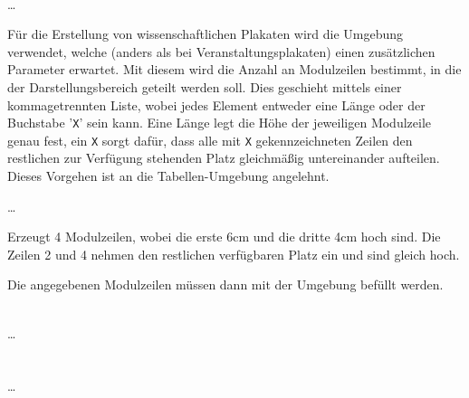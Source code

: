 \begin{Declaration}
    \\
  \quad\dots\\
\end{Declaration}

Für die Erstellung von wissenschaftlichen Plakaten wird die Umgebung
 verwendet, welche
(anders als bei Veranstaltungsplakaten) einen
zusätzlichen Parameter  erwartet.
Mit diesem wird die Anzahl an Modulzeilen bestimmt, in die der Darstellungsbereich geteilt werden soll. Dies geschieht mittels einer kommagetrennten Liste,
wobei jedes Element entweder eine Länge oder der Buchstabe '\texttt{X}' sein kann.
Eine Länge legt die Höhe der jeweiligen Modulzeile genau fest,
ein \texttt{X} sorgt dafür, dass alle mit \texttt{X} gekennzeichneten
Zeilen den restlichen zur Verfügung stehenden Platz gleichmäßig untereinander
aufteilen.
Dieses Vorgehen ist an die Tabellen-Umgebung  angelehnt.

\begin{minipage}{0.6\textwidth}
\begin{example}\par
  \noindent{}
    \par
  \quad\dots\\
  \bigskip\par
  \noindent Erzeugt 4 Modulzeilen, wobei die erste 6cm und die dritte 4cm hoch sind.
  Die Zeilen 2 und 4 nehmen den restlichen verfügbaren Platz ein
  und sind gleich hoch.
\end{example}
\end{minipage}
\hfill
\begin{minipage}{0.3\textwidth}\centering
\end{minipage}

Die angegebenen Modulzeilen müssen dann mit der Umgebung 
befüllt werden.

\begin{Declaration}
    \\%
  \quad\dots\\
  \\
    \\%
  \quad\dots\\
\end{Declaration}


